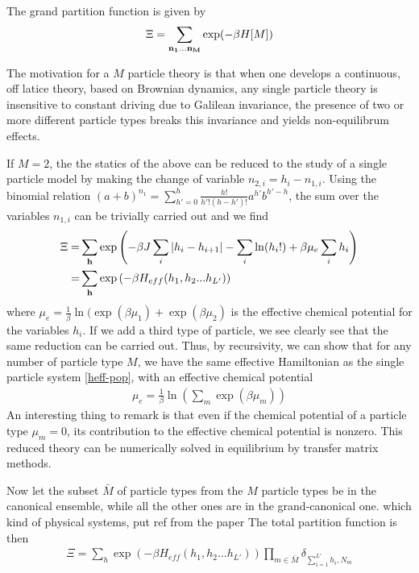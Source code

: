 The grand partition function is given by
\begin{align}
    \Xi = \sum_{{\bf n_1...n_M}} \exp(-\beta H[M])
\end{align}

The motivation for a $M$ particle theory is that when one develops a continuous, off latice theory, based on Brownian dynamics, any single particle theory is insensitive to constant driving due to Galilean invariance, the presence of two or more different particle types breaks this invariance and yields non-equilibrum effects.

If $M=2$, the the statics of the above can be reduced to the study of a single particle model by making the change of variable $n_{2,i} = h_i - n_{1,i}$. Using the binomial relation ${(a+b)^{n_1} = \sum_{h'=0}^h \frac{h!}{h'! (h-h')!} a^{h'} b^{h'-h}}$, the sum over the variables $n_{1,i}$ can be trivially carried out and we find
\begin{align}
    \Xi =& \sum_{\bf h} \exp \left( -\beta J \sum_i |h_i-h_{i+1}| - \sum_i \ln(h_i!) + \beta \mu_e \sum_i h_i \right) \nonumber \\
    =& \sum_{\bf h} \exp \left( -\beta H_{eff}(h_1,h_2...h_{L'}) \right)
\end{align}
where $\mu_e = \frac{1}{\beta}\ln( \exp(\beta \mu_1) + \exp(\beta \mu_2)$ is the effective chemical potential for the variables $h_i$. If we add a third type of particle, we see clearly see that the same reduction can be carried out. Thus, by recursivity, we can show that for any number of particle type $M$, we have the same effective Hamiltonian as the single particle system \eqref{heff-pop}, with an effective chemical potential
\begin{align}
    \mu_e = \frac{1}{\beta} \ln \left( \sum_m \exp( \beta \mu_m ) \right)
\end{align}
An interesting thing to remark is that even if the chemical potential of a particle type $\mu_m = 0$, its contribution to the effective chemical potential is nonzero. 
This reduced theory can be numerically solved in equilibrium by transfer matrix methods. 

Now let the subset $\bar{M}$ of particle types from the $M$ particle types be in the canonical ensemble, while all the other ones are in the grand-canonical one. {\color{red} which kind of physical systems, put ref from the paper} The total partition function is then
\begin{align}
    \Xi = \sum_h \exp \left( -\beta H_{eff}(h_1,h_2...h_{L'}) \right) \prod_{m \in \bar{M}}  \delta_{\sum_{i=1}^{L'} h_i,N_m}
\end{align}

